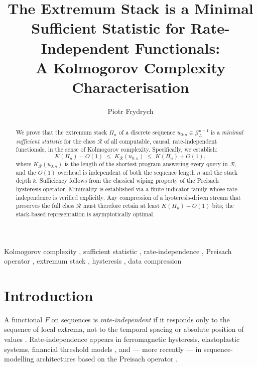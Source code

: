 \documentclass[preprint,12pt]{elsarticle}
\newcommand{\R}{\mathcal{R}}
\newcommand{\stack}{\Pi}
\begin{document}
\begin{frontmatter}

\title{The Extremum Stack is a Minimal Sufficient Statistic
  for Rate-Independent Functionals:\\
  A Kolmogorov Complexity Characterisation}

\author[pwut]{Piotr Frydrych}


\begin{abstract}
We prove that the extremum stack $\stack_n$ of a discrete sequence
$u_{0:n} \in \mathcal{G}_L^{n+1}$ is a \emph{minimal sufficient
statistic} for the class $\R$ of all computable,
causal, rate-independent functionals, in the sense of
Kolmogorov complexity.
Specifically, we establish:
\[
  K(\stack_n) - O(1)
  \;\leq\; K_{\R}(u_{0:n})
  \;\leq\; K(\stack_n) + O(1),
\]
where $K_{\R}(u_{0:n})$ is the length of the shortest program
answering every query in $\R$, and the $O(1)$
overhead is independent of both the sequence length $n$
and the stack depth $k$.
Sufficiency follows from the classical wiping property of the
Preisach hysteresis operator.
Minimality is established via a finite indicator family whose
rate-independence is verified explicitly.
Any compression of a hysteresis-driven stream that preserves
the full class $\R$ must therefore retain at least
$K(\stack_n) - O(1)$ bits; the stack-based representation is
asymptotically optimal.
\end{abstract}

\begin{keyword}
Kolmogorov complexity \sep
sufficient statistic \sep
rate-independence \sep
Preisach operator \sep
extremum stack \sep
hysteresis \sep
data compression
\end{keyword}

\end{frontmatter}

\section{Introduction}
\label{sec:intro}

A functional $F$ on sequences is \emph{rate-independent} if it
responds only to the sequence of local extrema, not to the
temporal spacing or absolute position of values
\citep{Brokate1996,Mayergoyz1991}.
Rate-independence appears in ferromagnetic hysteresis, elastoplastic
systems, financial threshold models \citep{Frydrych2014}, and —
more recently — in sequence-modelling architectures based on the
Preisach operator \citep{Frydrych2025PAL}.
\end{document}
